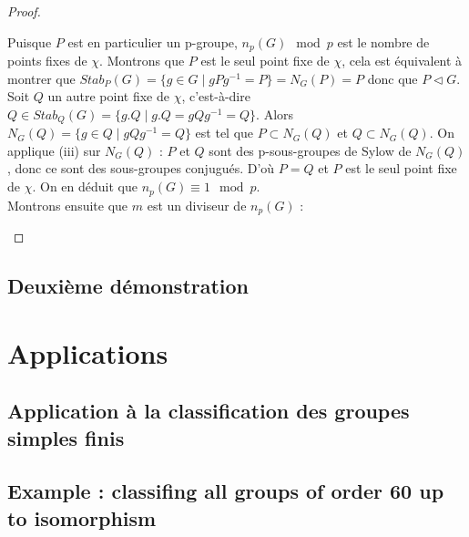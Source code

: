 \documentclass[french]{article}
\theoremstyle{definition}
\theoremstyle{plain}
\theoremstyle{plain}
\theoremstyle{plain}
\theoremstyle{plain}
\theoremstyle{plain}
\begin{document}
\begin{proof}
\begin{enumerate}[label={\upshape(\roman*)}]
Puisque \( P \) est en particulier un p-groupe, \( n_p(G) \mod p \) est le nombre de points fixes de \( \chi \). Montrons que \( P \) est le seul point fixe de \( \chi \), cela est équivalent à montrer que \( Stab_P(G) = \{ g \in G \mid gPg^{-1} = P \} = N_G(P) = P \) donc que \( P \triangleleft G \). Soit \( Q \) un autre point fixe de \( \chi \), c'est-à-dire \(Q \in Stab_Q(G) = \{g.Q \mid g.Q = gQg^{-1} = Q \}  \). 
Alors \( N_G(Q) = \{ g \in Q \mid gQg^{-1} = Q\} \) est tel que \( P \subset N_G(Q) \) et \( Q \subset N_G(Q) \).
On applique (iii) sur \( N_G(Q) \) : \( P \) et \( Q \) sont des p-sous-groupes de Sylow de \( N_G(Q) \), donc ce sont des sous-groupes conjugués. D'où \( P = Q \) et \( P \) est le seul point fixe de \( \chi \). On en déduit que \( n_p(G) \equiv 1 \mod p \). \\
Montrons ensuite que \( m \) est un diviseur de \( n_p(G) \) :
	\end{enumerate}
\end{proof}


\subsection{Deuxième démonstration}


\clearpage
\section{Applications}
\subsection{Application à la classification des groupes simples finis}

\cite{dummit2003abstract}

\subsection{Example : classifing all groups of order 60 up to isomorphism}


\clearpage

\printbibliography
\end{document}
